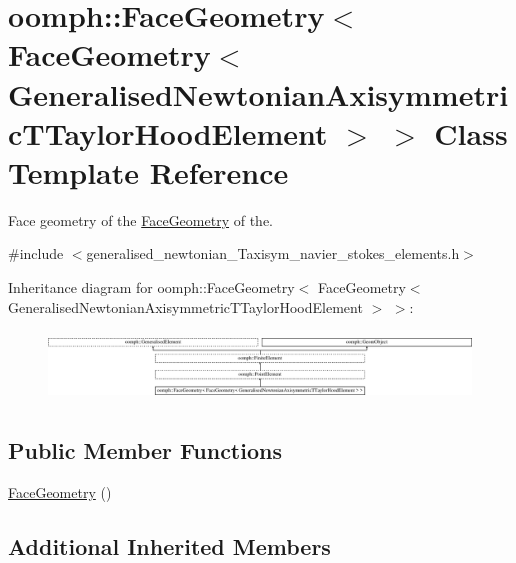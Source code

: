 \hypertarget{classoomph_1_1FaceGeometry_3_01FaceGeometry_3_01GeneralisedNewtonianAxisymmetricTTaylorHoodElement_01_4_01_4}{}\section{oomph\+:\+:Face\+Geometry$<$ Face\+Geometry$<$ Generalised\+Newtonian\+Axisymmetric\+T\+Taylor\+Hood\+Element $>$ $>$ Class Template Reference}
\label{classoomph_1_1FaceGeometry_3_01FaceGeometry_3_01GeneralisedNewtonianAxisymmetricTTaylorHoodElement_01_4_01_4}


Face geometry of the \hyperlink{classoomph_1_1FaceGeometry}{Face\+Geometry} of the.  




{\ttfamily \#include $<$generalised\+\_\+newtonian\+\_\+\+Taxisym\+\_\+navier\+\_\+stokes\+\_\+elements.\+h$>$}

Inheritance diagram for oomph\+:\+:Face\+Geometry$<$ Face\+Geometry$<$ Generalised\+Newtonian\+Axisymmetric\+T\+Taylor\+Hood\+Element $>$ $>$\+:\begin{figure}[H]
\begin{center}
\leavevmode
\includegraphics[height=1.882353cm]{classoomph_1_1FaceGeometry_3_01FaceGeometry_3_01GeneralisedNewtonianAxisymmetricTTaylorHoodElement_01_4_01_4}
\end{center}
\end{figure}
\subsection*{Public Member Functions}
\begin{DoxyCompactItemize}
\item 
\hyperlink{classoomph_1_1FaceGeometry_3_01FaceGeometry_3_01GeneralisedNewtonianAxisymmetricTTaylorHoodElement_01_4_01_4_ab167cdc517078aa6742c00aa36cf75a0}{Face\+Geometry} ()
\end{DoxyCompactItemize}
\subsection*{Additional Inherited Members}


